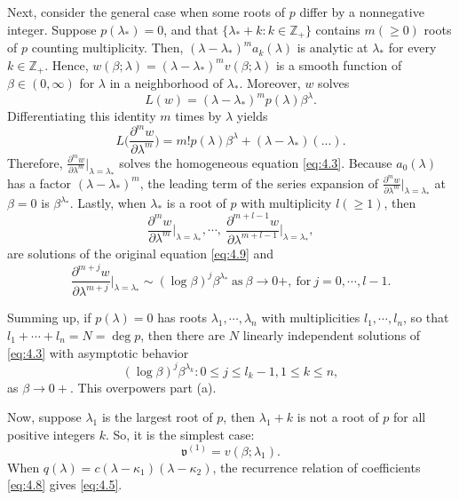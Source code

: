 \documentclass[11pt]{article}
\makeatletter
\renewenvironment{proof}[1][\proofname]{\par
  \vspace{-.7\topsep}%
  \pushQED{\qed}%
  \normalfont
  \topsep0pt \partopsep0pt %
  \trivlist
  \item[\hskip\labelsep
        \itshape
    #1\@addpunct{.}]\ignorespaces
}{%
  \popQED\endtrivlist\@endpefalse
  \addvspace{6pt plus 6pt} %
}
\theoremstyle{definition}
\theoremstyle{remark}
\numberwithin{equation}{section}
\newcommand{\mbb}{\mathbb}
\newcommand{\mfrak}{\mathfrak}
\newcommand{\Z}{\mbb{Z}}
\newcommand{\del}{\partial}
\newcommand{\upindex}[1]{^{(#1)}}
\makeatother
\begin{document}
\begin{proof}[Proof of Lemma \ref{lem:4.3}]
Next, consider the general case when some roots of $p$ differ by a nonnegative integer. Suppose $p(\lambda_*) = 0$, and that $\{\lambda_* + k : k \in\Z_+\}$ contains $m (\geq 0)$ roots of $p$ counting multiplicity. Then, $(\lambda - \lambda_*)^m a_k(\lambda)$ is analytic at $\lambda_*$ for every $k\in\Z_+$. Hence, $w(\beta;\lambda) = (\lambda - \lambda_*)^m v(\beta;\lambda)$ is a smooth function of $\beta\in(0,\infty)$ for $\lambda$ in a neighborhood of $\lambda_*$. Moreover, $w$ solves
\[L(w) = (\lambda - \lambda_*)^m p(\lambda) \beta^\lambda.\]
Differentiating this identity $m$ times by $\lambda$ yields
\[ L\bigg( \frac{\del^m w}{\del\lambda^m} \bigg) = m! p(\lambda) \beta^\lambda + (\lambda - \lambda_*) (...).\]
Therefore, $\frac{\del^m w}{\del\lambda^m}\vert_{\lambda = \lambda_*}$ solves the homogeneous equation \eqref{eq:4.3}. Because $a_0(\lambda)$ has a factor $(\lambda - \lambda_*)^m$, the leading term of the series expansion of $\frac{\del^m w}{\del\lambda^m}\vert_{\lambda = \lambda_*}$ at $\beta = 0$ is $\beta^{\lambda_*}$. Lastly, when $\lambda_*$ is a root of $p$ with multiplicity $l(\geq 1)$, then
\[\frac{\del^m w}{\del\lambda^m}\Big\vert_{\lambda = \lambda_*}, \cdots,~ \frac{\del^{m+l-1} w}{\del\lambda^{m+l-1}}\Big\vert_{\lambda = \lambda_*},\]
are solutions of the original equation \eqref{eq:4.9} and
\[\frac{\del^{m+j} w}{\del\lambda^{m+j}}\Big\vert_{\lambda = \lambda_*} \sim (\log\beta)^j \beta^{\lambda_*} ~\text{as}~ \beta \to 0+, ~\text{for}~ j=0,\cdots,l-1.\]

Summing up, if $p(\lambda) = 0$ has roots $\lambda_1, \cdots, \lambda_n$ with multiplicities $l_1, \cdots, l_n$, so that $l_1 + \cdots + l_n = N = \deg p$, then there are $N$ linearly independent solutions of \eqref{eq:4.3} with asymptotic behavior
\[ (\log\beta)^{j} \beta^{\lambda_k} : 0\leq j\leq l_k - 1, 1\leq k\leq n,\]
as $\beta \to 0+$. This overpowers part (a).

Now, suppose $\lambda_1$ is the largest root of $p$, then $\lambda_1 + k$ is not a root of $p$ for all positive integers $k$. So, it is the simplest case:
\[\mfrak{v}\upindex{1} = v(\beta;\lambda_1).\]
When $q(\lambda) = c(\lambda - \kappa_1)(\lambda - \kappa_2)$, the recurrence relation of coefficients \eqref{eq:4.8} gives \eqref{eq:4.5}.


\end{proof}
\end{document}
